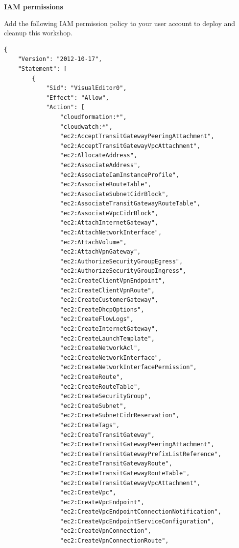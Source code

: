 \vspace{0.5em}\noindent\textbf{IAM permissions}\par

Add the following IAM permission policy to your user account to deploy
and cleanup this workshop.

\begin{verbatim}
{
    "Version": "2012-10-17",
    "Statement": [
        {
            "Sid": "VisualEditor0",
            "Effect": "Allow",
            "Action": [
                "cloudformation:*",
                "cloudwatch:*",
                "ec2:AcceptTransitGatewayPeeringAttachment",
                "ec2:AcceptTransitGatewayVpcAttachment",
                "ec2:AllocateAddress",
                "ec2:AssociateAddress",
                "ec2:AssociateIamInstanceProfile",
                "ec2:AssociateRouteTable",
                "ec2:AssociateSubnetCidrBlock",
                "ec2:AssociateTransitGatewayRouteTable",
                "ec2:AssociateVpcCidrBlock",
                "ec2:AttachInternetGateway",
                "ec2:AttachNetworkInterface",
                "ec2:AttachVolume",
                "ec2:AttachVpnGateway",
                "ec2:AuthorizeSecurityGroupEgress",
                "ec2:AuthorizeSecurityGroupIngress",
                "ec2:CreateClientVpnEndpoint",
                "ec2:CreateClientVpnRoute",
                "ec2:CreateCustomerGateway",
                "ec2:CreateDhcpOptions",
                "ec2:CreateFlowLogs",
                "ec2:CreateInternetGateway",
                "ec2:CreateLaunchTemplate",
                "ec2:CreateNetworkAcl",
                "ec2:CreateNetworkInterface",
                "ec2:CreateNetworkInterfacePermission",
                "ec2:CreateRoute",
                "ec2:CreateRouteTable",
                "ec2:CreateSecurityGroup",
                "ec2:CreateSubnet",
                "ec2:CreateSubnetCidrReservation",
                "ec2:CreateTags",
                "ec2:CreateTransitGateway",
                "ec2:CreateTransitGatewayPeeringAttachment",
                "ec2:CreateTransitGatewayPrefixListReference",
                "ec2:CreateTransitGatewayRoute",
                "ec2:CreateTransitGatewayRouteTable",
                "ec2:CreateTransitGatewayVpcAttachment",
                "ec2:CreateVpc",
                "ec2:CreateVpcEndpoint",
                "ec2:CreateVpcEndpointConnectionNotification",
                "ec2:CreateVpcEndpointServiceConfiguration",
                "ec2:CreateVpnConnection",
                "ec2:CreateVpnConnectionRoute",

\end{verbatim}
